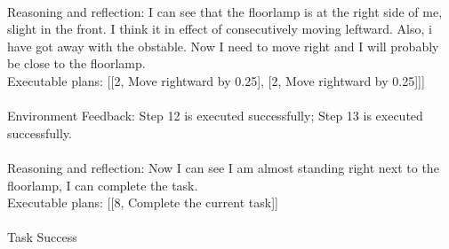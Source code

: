 \begin{tcolorbox}[colback=gray!5!white, colframe=gray!75!black, 
title=In-context examples for EB-Navigation, boxrule=0.5mm, width=\textwidth, arc=3mm, auto outer arc=true]
\\
Reasoning and reflection: I can see that the floorlamp is at the right side of me, slight in the front. I think it in effect of consecutively moving leftward. Also, i have got away with the obstable. Now I need to move right and I will probably be close to the floorlamp.\\
Executable plans: [[2, Move rightward by 0.25], [2, Move rightward by 0.25]]]\\
\\
Environment Feedback: Step 12 is executed successfully; Step 13 is executed successfully. \\
\\
Reasoning and reflection: Now I can see I am almost standing right next to the floorlamp, I can complete the task.\\
Executable plans: [[8, Complete the current task]]\\
\\
Task Success
\end{tcolorbox}

